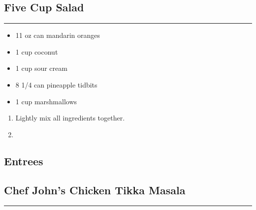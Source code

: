 \documentclass{article}
\begin{document}
\subsection{Five Cup Salad} 
\noindent\rule[0.5ex]{\linewidth}{1pt}

\begin{framed}
\begin{itemize}
    \item 11 oz can mandarin oranges
    \item 1 cup coconut
    \item 1 cup sour cream
    \item 8 1/4 can pineapple tidbits
    \item 1 cup marshmallows
\end{itemize}
\end{framed}

\begin{enumerate}
    \item 
        Lightly mix all ingredients together.
    \item
\end{enumerate}
\newpage

\vspace*{\fill}
\begin{center}
    \section{Entrees}
\end{center}
\vspace*{\fill}
\newpage

\subsection{Chef John's Chicken Tikka Masala} 
\noindent\rule[0.5ex]{\linewidth}{1pt}
\end{document}
